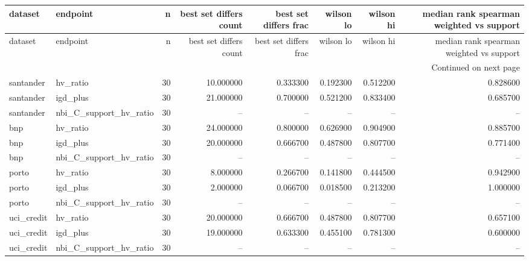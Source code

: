 \begin{landscape}
\begin{center}\label{tab:s9cost}\end{center}
\begingroup\tiny\setlength{\tabcolsep}{2.5pt}
\begin{longtable}{llrrrrrr}
\toprule
dataset & endpoint & n & best set differs count & best set differs frac & wilson lo & wilson hi & median rank spearman weighted vs support \\
\midrule
\endfirsthead
\toprule
dataset & endpoint & n & best set differs count & best set differs frac & wilson lo & wilson hi & median rank spearman weighted vs support \\
\midrule
\endhead
\midrule
\multicolumn{8}{r}{Continued on next page} \\
\midrule
\endfoot
\bottomrule
\endlastfoot
santander & hv\_ratio & 30 & 10.000000 & 0.333300 & 0.192300 & 0.512200 & 0.828600 \\
santander & igd\_plus & 30 & 21.000000 & 0.700000 & 0.521200 & 0.833400 & 0.685700 \\
santander & nbi\_C\_support\_hv\_ratio & 30 & -- & -- & -- & -- & -- \\
bnp & hv\_ratio & 30 & 24.000000 & 0.800000 & 0.626900 & 0.904900 & 0.885700 \\
bnp & igd\_plus & 30 & 20.000000 & 0.666700 & 0.487800 & 0.807700 & 0.771400 \\
bnp & nbi\_C\_support\_hv\_ratio & 30 & -- & -- & -- & -- & -- \\
porto & hv\_ratio & 30 & 8.000000 & 0.266700 & 0.141800 & 0.444500 & 0.942900 \\
porto & igd\_plus & 30 & 2.000000 & 0.066700 & 0.018500 & 0.213200 & 1.000000 \\
porto & nbi\_C\_support\_hv\_ratio & 30 & -- & -- & -- & -- & -- \\
uci\_credit & hv\_ratio & 30 & 20.000000 & 0.666700 & 0.487800 & 0.807700 & 0.657100 \\
uci\_credit & igd\_plus & 30 & 19.000000 & 0.633300 & 0.455100 & 0.781300 & 0.600000 \\
uci\_credit & nbi\_C\_support\_hv\_ratio & 30 & -- & -- & -- & -- & -- \\
\end{longtable}\endgroup\addtocounter{table}{-1}

\end{landscape}
